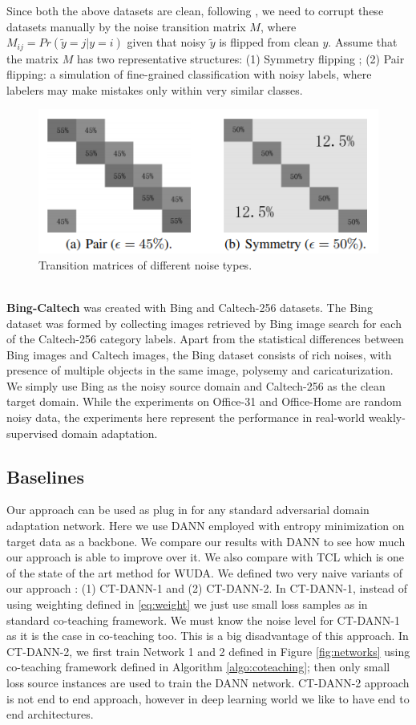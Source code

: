 Since both the above datasets are clean, following \cite{e43c87956bec4495a9f947cef8ea2780}, we need to corrupt these datasets manually by the noise transition matrix $M$, where $M_{ij} = Pr(\tilde{y} = j|y = i)$ given that noisy $\tilde{y}$ is flipped from clean $y$. Assume that the matrix $M$ has two representative structures: (1) Symmetry flipping \cite{10.5555/2969239.2969241};
(2) Pair flipping: a simulation of fine-grained classification with noisy labels, where labelers may make mistakes only within very similar classes.\\
\begin{figure}[ht]
            \centering
            \includegraphics[scale = 0.5]{noise.png}
            \caption{Transition matrices of different noise types.}
\label{fig:noise}
\end{figure}\\
\textbf{Bing-Caltech} \cite{bing-caltech} was created with Bing and Caltech-256 datasets. The Bing dataset was formed by collecting images retrieved by Bing image search for each of the Caltech-256 category labels. Apart from the statistical differences between Bing images and Caltech images, the Bing dataset consists of rich noises, with presence of multiple objects in the same image, polysemy and caricaturization. We simply use Bing as the noisy source domain and Caltech-256 as the clean target domain. While the experiments on Office-31 and Office-Home are random noisy
data, the experiments here represent the performance in real-world weakly-supervised domain adaptation.
\subsection{Baselines}
\label{subsec:baseline}
Our approach can be used as plug in for any standard adversarial domain adaptation network. Here we use DANN\cite{dann} employed with entropy minimization on target data as a backbone. We compare our results with DANN to see how much our approach is able to improve over it. We also compare with TCL \cite{tcl} which is one of the state of the art method for WUDA. We defined two very naive variants of our approach : (1) CT-DANN-1 and (2) CT-DANN-2. In CT-DANN-1, instead of using weighting defined in \ref{eq:weight} we just use small loss samples as in standard co-teaching framework. We must know the noise level for CT-DANN-1 as it is the case in co-teaching too. This is a big disadvantage of this approach. In CT-DANN-2, we first train Network 1 and 2 defined in Figure \ref{fig:networks} using co-teaching framework defined in Algorithm \ref{algo:coteaching}; then only small loss source instances are used to train the DANN network. CT-DANN-2 approach is not end to end approach, however in deep learning world we like to have end to end architectures.
